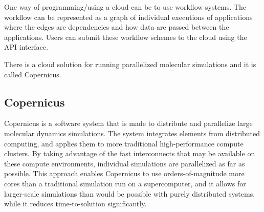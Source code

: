 


One way of programming/using a cloud can be to use workflow
systems. The workflow can be represented as a graph of individual
executions of applications where the edges are dependencies and how
data are passed between the applications. Users can submit these
workflow schemes to the cloud using the API interface.







There is a cloud solution for running parallelized molecular
simulations and it is called Copernicus.


\subsection{Copernicus}
Copernicus is a software system that is made to distribute and
parallelize large molecular dynamics simulations. The system
integrates elements from distributed computing, and applies them to
more traditional high-performance compute clusters. By taking
advantage of the fast interconnects that may be available on these
compute environments, individual simulations are parallelized as far
as possible. This approach enables Copernicus to use
orders-of-magnitude more cores than a traditional simulation run on a
supercomputer, and it allows for larger-scale simulations than would
be possible with purely distributed systems, while it reduces
time-to-solution significantly.

